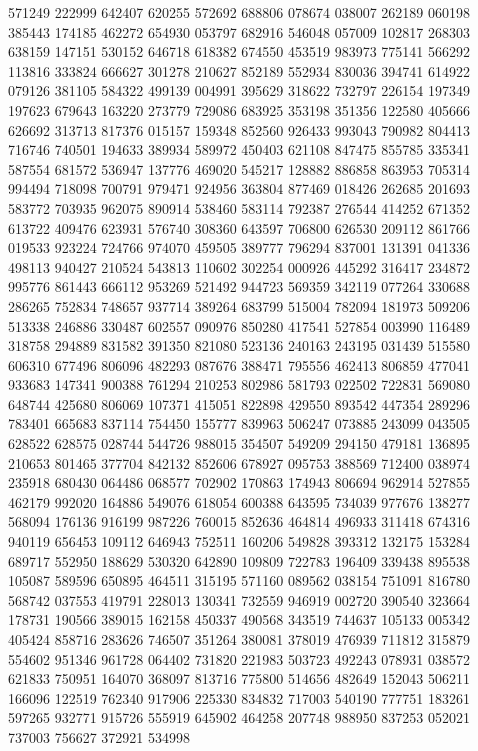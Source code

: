 {571249 222999 642407 620255 572692 688806 078674 038007 262189 060198 385443%
174185 462272 654930 053797 682916 546048 057009 102817 268303 638159 147151%
530152 646718 618382 674550 453519 983973 775141 566292 113816 333824 666627%
301278 210627 852189 552934 830036 394741 614922 079126 381105 584322 499139%
004991 395629 318622 732797 226154 197349 197623 679643 163220 273779 729086%
683925 353198 351356 122580 405666 626692 313713 817376 015157 159348 852560%
926433 993043 790982 804413 716746 740501 194633 389934 589972 450403 621108%
847475 855785 335341 587554 681572 536947 137776 469020 545217 128882 886858%
863953 705314 994494 718098 700791 979471 924956 363804 877469 018426 262685%
201693 583772 703935 962075 890914 538460 583114 792387 276544 414252 671352%
613722 409476 623931 576740 308360 643597 706800 626530 209112 861766 019533%
923224 724766 974070 459505 389777 796294 837001 131391 041336 498113 940427%
210524 543813 110602 302254 000926 445292 316417 234872 995776 861443 666112%
953269 521492 944723 569359 342119 077264 330688 286265 752834 748657 937714%
389264 683799 515004 782094 181973 509206 513338 246886 330487 602557 090976%
850280 417541 527854 003990 116489 318758 294889 831582 391350 821080 523136%
240163 243195 031439 515580 606310 677496 806096 482293 087676 388471 795556%
462413 806859 477041 933683 147341 900388 761294 210253 802986 581793 022502%
722831 569080 648744 425680 806069 107371 415051 822898 429550 893542 447354%
289296 783401 665683 837114 754450 155777 839963 506247 073885 243099 043505%
628522 628575 028744 544726 988015 354507 549209 294150 479181 136895 210653%
801465 377704 842132 852606 678927 095753 388569 712400 038974 235918 680430%
064486 068577 702902 170863 174943 806694 962914 527855 462179 992020 164886%
549076 618054 600388 643595 734039 977676 138277 568094 176136 916199 987226%
760015 852636 464814 496933 311418 674316 940119 656453 109112 646943 752511%
160206 549828 393312 132175 153284 689717 552950 188629 530320 642890 109809%
722783 196409 339438 895538 105087 589596 650895 464511 315195 571160 089562%
038154 751091 816780 568742 037553 419791 228013 130341 732559 946919 002720%
390540 323664 178731 190566 389015 162158 450337 490568 343519 744637 105133%
005342 405424 858716 283626 746507 351264 380081 378019 476939 711812 315879%
554602 951346 961728 064402 731820 221983 503723 492243 078931 038572 621833%
750951 164070 368097 813716 775800 514656 482649 152043 506211 166096 122519%
762340 917906 225330 834832 717003 540190 777751 183261 597265 932771 915726%
555919 645902 464258 207748 988950 837253 052021 737003 756627 372921 534998%
}
